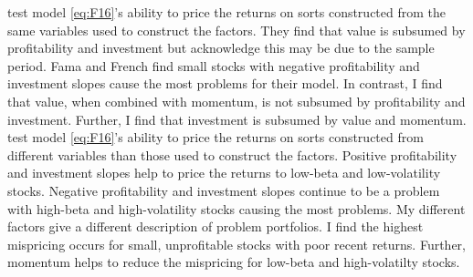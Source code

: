 \textcite{fama2015five} test model \ref{eq:F16}'s ability
to price the returns on sorts constructed from the same variables
used to construct the factors.
They find that value is subsumed by profitability and investment but
acknowledge this may be due to the sample period.
Fama and French find small stocks with negative profitability and investment
slopes cause the most problems for their model.
In contrast, I find that value, when combined with momentum, is not subsumed by
profitability and investment.
Further, I find that investment is subsumed by value and momentum.
\textcite{fama2016dissecting} test model \ref{eq:F16}'s ability
to price the returns on sorts constructed from different variables than those
used to construct the factors.
Positive profitability and investment slopes help to price the returns to
low-beta and low-volatility stocks.
Negative profitability and investment slopes continue to be a problem with
high-beta and high-volatility stocks causing the most problems.
My different factors give a different description of problem portfolios.
I find the highest mispricing occurs for small, unprofitable stocks with poor
recent returns.
Further, momentum helps to reduce the mispricing for low-beta and high-volatilty
stocks.
